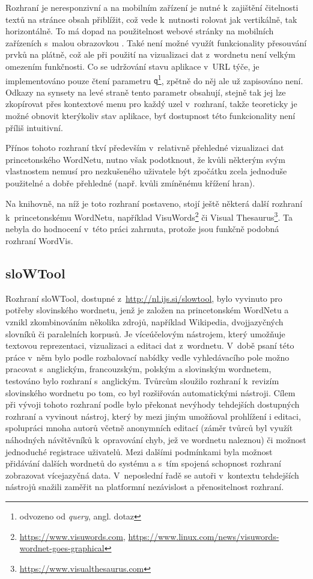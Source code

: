 \documentclass[a4paper,11pt,openany,twoside]{book}
\begin{document}
					Rozhraní je neresponzivní a na mobilním zařízení je nutné k~zajištění čitelnosti textů na stránce obsah přiblížit, což vede k~nutnosti rolovat jak vertikálně, tak horizontálně. To má dopad na použitelnost webové stránky na mobilních zařízeních s~malou obrazovkou \parencite{nn2005scrollbar, richards2004web}. Také není možné využít funkcionality přesouvání prvků na plátně, což ale při použití na vizualizaci dat z~wordnetu není velkým omezením funkčnosti. Co se udržování stavu aplikace v~URL týče, je implementováno pouze čtení parametru {\tt q}\footnote{odvozeno od \textit{query}, angl. dotaz}, zpětně do něj ale už zapisováno není. Odkazy na synsety na levé straně tento parametr obsahují, stejně tak jej lze zkopírovat přes kontextové menu pro každý uzel v~rozhraní, takže teoreticky je možné obnovit kterýkoliv stav aplikace, byť dostupnost této funkcionality není příliš intuitivní.

					Přínos tohoto rozhraní tkví především v~relativně přehledné vizualizaci dat princetonského WordNetu, nutno však podotknout, že kvůli některým svým vlastnostem nemusí pro nezkušeného uživatele být zpočátku zcela jednoduše použitelné a dobře přehledné (např. kvůli zmíněnému křížení hran).

					Na knihovně, na níž je toto rozhraní postaveno, stojí ještě některá další rozhraní k~princetonskému WordNetu, například VisuWords\footnote{\url{https://www.visuwords.com}, \url{https://www.linux.com/news/visuwords-wordnet-goes-graphical}} či Visual Thesaurus\footnote{\url{https://www.visualthesaurus.com}}. Ta nebyla do hodnocení v~této práci zahrnuta, protože jsou funkčně podobná rozhraní WordVis.

				\subsection{sloWTool}
				\label{vis:slowtool}

					Rozhraní sloWTool, dostupné z~\url{http://nl.ijs.si/slowtool}, bylo vyvinuto pro potřeby slovinského wordnetu, jenž je založen na princetonském WordNetu a vznikl zkombinováním několika zdrojů, například Wikipedia, dvojjazyčných slovníků či paralelních korpusů. Je víceúčelovým nástrojem, který umožňuje textovou reprezentaci, vizualizaci a editaci dat z~wordnetu. V~době psaní této práce v~něm bylo podle rozbalovací nabídky vedle vyhledávacího pole možno pracovat s~anglickým, francouzským, polským a slovinským wordnetem, testováno bylo rozhraní s~anglickým. Tvůrcům sloužilo rozhraní k~revizím slovinského wordnetu po tom, co byl rozšiřován automatickými nástroji. \parencite{fivser2012slownet} Cílem při vývoji tohoto rozhraní podle \textcite{fivser2011visualizing} bylo překonat nevýhody tehdejších dostupných rozhraní a vyvinout nástroj, který by mezi jiným umožňoval prohlížení i editaci, spolupráci mnoha autorů včetně anonymních editací (záměr tvůrců byl využít náhodných návštěvníků k~opravování chyb, jež ve wordnetu naleznou) či možnost jednoduché registrace uživatelů. Mezi dalšími podmínkami byla možnost přidávání dalších wordnetů do systému a s~tím spojená schopnost rozhraní zobrazovat vícejazyčná data. V~neposlední řadě se autoři v~kontextu tehdejších nástrojů snažili zaměřit na platformní nezávislost a přenositelnost rozhraní. 
\end{document}
